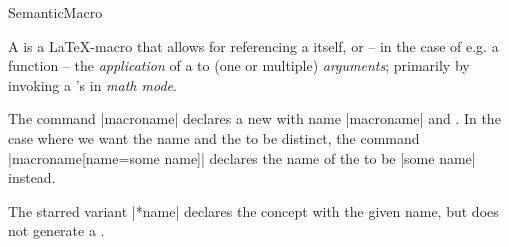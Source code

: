 \documentclass{stex}
\begin{document}
  \begin{smodule}[title=Semantic Macros]{SemanticMacro}

    \begin{sparagraph}[style={defibox,symdoc},name=semantic macro]

        A  is a \LaTeX-macro that allows 
        for referencing a  itself, or -- in the case of 
        e.g. a function -- the \emph{application} of a  to 
        (one or multiple) \emph{arguments}; primarily by invoking a 
        's  in \emph{math mode}.

        The command |{macroname}| declares a new
         with name |macroname| and 
        . In the case where we want the name and the 
         to be distinct,
        the command |{macroname}[name=some name]|
        declares the name of the  to be |some name|
        instead. 

        The starred variant |*{name}| declares the concept
        with the given name, but does not generate a .
    \end{sparagraph}
    
  \end{smodule}
\end{document}
